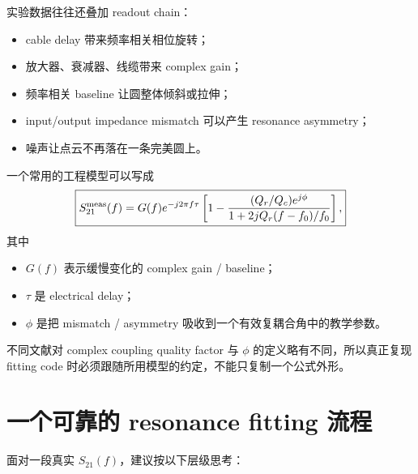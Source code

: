 \documentclass[11pt,a4paper,openany]{ctexrep}
\begin{document}
实验数据往往还叠加 readout chain：
\begin{itemize}
  \item cable delay 带来频率相关相位旋转；
  \item 放大器、衰减器、线缆带来 complex gain；
  \item 频率相关 baseline 让圆整体倾斜或拉伸；
  \item input/output impedance mismatch 可以产生 resonance asymmetry；
  \item 噪声让点云不再落在一条完美圆上。
\end{itemize}

一个常用的工程模型可以写成
\[
\boxed{
S_{21}^{\rm meas}(f)
=
G(f)e^{-j2\pi f\tau}
\left[
1-
\frac{(Q_r/Q_c)e^{j\phi}}
{1+2jQ_r(f-f_0)/f_0}
\right],
}
\]
其中
\begin{itemize}
  \item $G(f)$ 表示缓慢变化的 complex gain / baseline；
  \item $\tau$ 是 electrical delay；
  \item $\phi$ 是把 mismatch / asymmetry 吸收到一个有效复耦合角中的教学参数。
\end{itemize}

不同文献对 complex coupling quality factor 与 $\phi$ 的定义略有不同，所以真正复现 fitting code 时必须跟随所用模型的约定，不能只复制一个公式外形。

\section{一个可靠的 resonance fitting 流程}

面对一段真实 $S_{21}(f)$，建议按以下层级思考：

\begin{center}
\end{center}
\end{document}
